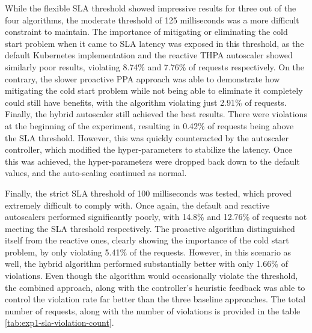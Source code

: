 While the flexible SLA threshold showed impressive results for three out of the four algorithms, the moderate threshold of 125 milliseconds was a more difficult constraint to maintain. The importance of mitigating or eliminating the cold start problem when it came to SLA latency was exposed in this threshold, as the default Kubernetes implementation and the reactive THPA autoscaler showed similarly poor results, violating 8.74\% and 7.76\% of requests respectively. On the contrary, the slower proactive PPA approach was able to demonstrate how mitigating the cold start problem while not being able to eliminate it completely could still have benefits, with the algorithm violating just 2.91\% of requests. Finally, the hybrid autoscaler still achieved the best results. There were violations at the beginning of the experiment, resulting in 0.42\% of requests being above the SLA threshold. However, this was quickly counteracted by the autoscaler controller, which modified the hyper-parameters to stabilize the latency. Once this was achieved, the hyper-parameters were dropped back down to the default values, and the auto-scaling continued as normal.\par

Finally, the strict SLA threshold of 100 milliseconds was tested, which proved extremely difficult to comply with. Once again, the default and reactive autoscalers performed significantly poorly, with 14.8\% and 12.76\% of requests not meeting the SLA threshold respectively. The proactive algorithm distinguished itself from the reactive ones, clearly showing the importance of the cold start problem, by only violating 5.41\% of the requests. However, in this scenario as well, the hybrid algorithm performed substantially better with only 1.66\% of violations. Even though the algorithm would occasionally violate the threshold, the combined approach, along with the controller's heuristic feedback was able to control the violation rate far better than the three baseline approaches. The total number of requests, along with the number of violations is provided in the table \ref{tab:exp1-sla-violation-count}.\par

